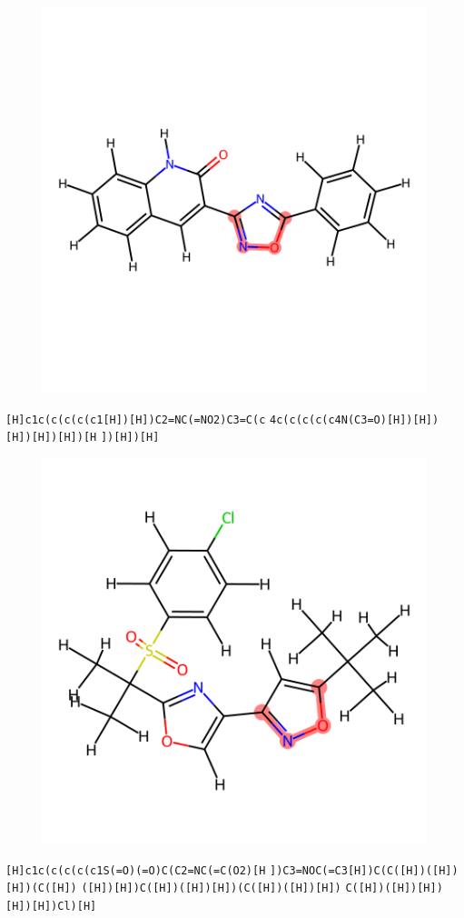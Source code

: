 \documentclass{article}
\begin{document}
\begin{figure}[ht]
\centering
    \includegraphics{mol76.png}
\end{figure}
\verb|[H]c1c(c(c(c(c1[H])[H])C2=NC(=NO2)C3=C(c| \verb|4c(c(c(c(c4N(C3=O)[H])[H])[H])[H])[H])[H| \verb|])[H])[H]|

\begin{figure}[ht]
\centering
    \includegraphics{mol77.png}
\end{figure}
\verb|[H]c1c(c(c(c(c1S(=O)(=O)C(C2=NC(=C(O2)[H| \verb|])C3=NOC(=C3[H])C(C([H])([H])[H])(C([H])| \verb|([H])[H])C([H])([H])[H])(C([H])([H])[H])| \verb|C([H])([H])[H])[H])[H])Cl)[H]|
\end{document}
